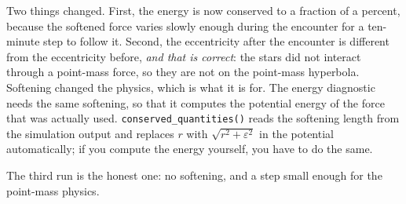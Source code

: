 \documentclass[
  10.5pt,
  letterpaper,
]{scrbook}
\newenvironment{Shaded}{\begin{snugshade}}{\end{snugshade}}
\newcommand{\AttributeTok}[1]{\textcolor[rgb]{0.00,0.00,0.00}{#1}}
\newcommand{\CommentTok}[1]{\textcolor[rgb]{0.00,0.00,0.00}{\textit{#1}}}
\newcommand{\DecValTok}[1]{\textcolor[rgb]{0.00,0.00,0.00}{#1}}
\newcommand{\FloatTok}[1]{\textcolor[rgb]{0.00,0.00,0.00}{#1}}
\newcommand{\FunctionTok}[1]{\textcolor[rgb]{0.00,0.00,0.00}{#1}}
\newcommand{\NormalTok}[1]{\textcolor[rgb]{0.00,0.00,0.00}{#1}}
\newcommand{\OtherTok}[1]{\textcolor[rgb]{0.00,0.00,0.00}{#1}}
\newcommand{\SpecialCharTok}[1]{\textcolor[rgb]{0.00,0.00,0.00}{#1}}
\newcommand{\StringTok}[1]{\textcolor[rgb]{0.00,0.00,0.00}{#1}}
\theoremstyle{plain}
\theoremstyle{remark}
\begin{document}
\begin{Shaded}
\end{Shaded}

Two things changed. First, the energy is now conserved to a fraction of
a percent, because the softened force varies slowly enough during the
encounter for a ten-minute step to follow it. Second, the eccentricity
after the encounter is different from the eccentricity before, \emph{and
that is correct}: the stars did not interact through a point-mass force,
so they are not on the point-mass hyperbola. Softening changed the
physics, which is what it is for. The energy diagnostic needs the same
softening, so that it computes the potential energy of the force that
was actually used. \texttt{conserved\_quantities()} reads the softening
length from the simulation output and replaces \(r\) with
\(\sqrt{r^2+\varepsilon^2}\) in the potential automatically; if you
compute the energy yourself, you have to do the same.

The third run is the honest one: no softening, and a step small enough
for the point-mass physics.
\end{document}
